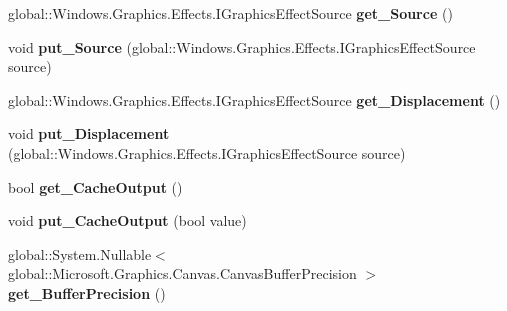 \begin{DoxyCompactItemize}
global\+::\+Windows.\+Graphics.\+Effects.\+I\+Graphics\+Effect\+Source {\bfseries get\+\_\+\+Source} ()
\item 
\mbox{\label{class_microsoft_1_1_graphics_1_1_canvas_1_1_effects_1_1_displacement_map_effect_a111bf667fceee07085a750745d777c13}} 
void {\bfseries put\+\_\+\+Source} (global\+::\+Windows.\+Graphics.\+Effects.\+I\+Graphics\+Effect\+Source source)
\item 
\mbox{\label{class_microsoft_1_1_graphics_1_1_canvas_1_1_effects_1_1_displacement_map_effect_aaf5364680c98ed0f56450c34b38dd81a}} 
global\+::\+Windows.\+Graphics.\+Effects.\+I\+Graphics\+Effect\+Source {\bfseries get\+\_\+\+Displacement} ()
\item 
\mbox{\label{class_microsoft_1_1_graphics_1_1_canvas_1_1_effects_1_1_displacement_map_effect_ae673a7b19adf4c74fc290965e8c469d3}} 
void {\bfseries put\+\_\+\+Displacement} (global\+::\+Windows.\+Graphics.\+Effects.\+I\+Graphics\+Effect\+Source source)
\item 
\mbox{\label{class_microsoft_1_1_graphics_1_1_canvas_1_1_effects_1_1_displacement_map_effect_a98dc9dff78bcf54a0714684a37fac496}} 
bool {\bfseries get\+\_\+\+Cache\+Output} ()
\item 
\mbox{\label{class_microsoft_1_1_graphics_1_1_canvas_1_1_effects_1_1_displacement_map_effect_a6ea6152dfdb5861dd9ddb378972ab881}} 
void {\bfseries put\+\_\+\+Cache\+Output} (bool value)
\item 
\mbox{\label{class_microsoft_1_1_graphics_1_1_canvas_1_1_effects_1_1_displacement_map_effect_a85345dfa5889a8d0eeaa2c0eef0af1f6}} 
global\+::\+System.\+Nullable$<$ global\+::\+Microsoft.\+Graphics.\+Canvas.\+Canvas\+Buffer\+Precision $>$ {\bfseries get\+\_\+\+Buffer\+Precision} ()
\item 
\mbox{\label{class_microsoft_1_1_graphics_1_1_canvas_1_1_effects_1_1_displacement_map_effect_ad6130a57ecf408ba6f8e0e9e37720c01}} 

\end{DoxyCompactItemize}
